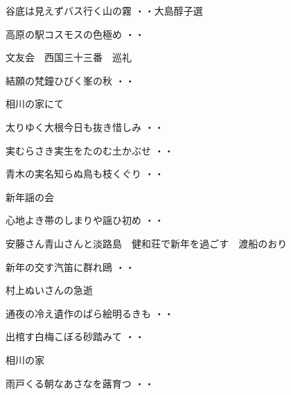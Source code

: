 \vspace{0.6cm}
\begin{shiika}谷底は見えずバス行く山の霧
\hfill{・・大島醇子選}\end{shiika}
\vspace{0.6cm}
\begin{shiika}高原の駅コスモスの色極め
\hfill{・・}\end{shiika}
\vspace{0.6cm}
文友会　西国三十三番　巡礼
\begin{shiika}結願の梵鐘ひびく峯の秋
\hfill{・・}\end{shiika}
\vspace{0.6cm}
相川の家にて
\begin{shiika}太りゆく大根今日も抜き惜しみ
\hfill{・・}\end{shiika}
\begin{shiika}実むらさき実生をたのむ土かぶせ
\hfill{・・}\end{shiika}
\begin{shiika}青木の実名知らぬ鳥も枝くぐり
\hfill{・・}\end{shiika}
\vspace{0.6cm}
新年謡の会
\begin{shiika}心地よき帯のしまりや謡ひ初め
\hfill{・・}\end{shiika}
\vspace{0.6cm}
安藤さん青山さんと淡路島　健和荘で新年を過ごす　渡船のおり
\begin{shiika}新年の交す汽笛に群れ鴎
\hfill{・・}\end{shiika}
\vspace{0.6cm}
村上ぬいさんの急逝
\begin{shiika}通夜の冷え遺作のばら絵明るきも
\hfill{・・}\end{shiika}
\begin{shiika}出棺す白梅こぼる砂踏みて
\hfill{・・}\end{shiika}
\vspace{0.6cm}
相川の家
\begin{shiika}雨戸くる朝なあさなを蕗育つ
\hfill{・・}\end{shiika}
